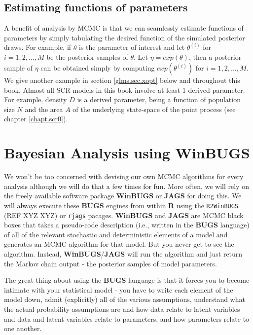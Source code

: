 \subsection{Estimating functions of parameters}

A benefit of analysis by MCMC is that we can seamlessly estimate
functions of parameters by simply tabulating the desired function of
the simulated posterior draws. For example, if $\theta$ is the
parameter of interest and let $\theta^{(i)}$ for $i=1,2,\ldots,M$ be
the posterior samples of $\theta$. Let $\eta = exp(\theta)$, then a
posterior sample of $\eta$ can be obtained simply by computing
$exp(\theta^{(i)})$ for $i=1,2,\ldots,M$. We give another example in
section
\ref{glms.sec.xopt}
below and throughout this book.
Almost all SCR models in this book involve at least 1 derived
parameter. For example, density $D$ is a derived parameter, being a
function of population size $N$ and the area $A$ of the underlying
state-space of the point process (see chapter \ref{chapt.scr0}).

\section{Bayesian Analysis using WinBUGS}

We won't be too concerned with devising our own MCMC algorithms for
every analysis
although we will do that a few times for fun.  More often, we
will rely on the freely available software package {\bf WinBUGS} or
{\bf JAGS}
for doing this.  We will always execute these {\bf BUGS} engines from
within {\bf R} using the \mbox{\tt R2WinBUGS} (REF XYZ XYZ) or
\mbox{\tt rjags} pacages. {\bf WinBUGS} and {\bf JAGS} are  MCMC black boxes
that takes a pseudo-code description (i.e., written in the {\bf BUGS}
language) of all of the relevant stochastic
and deterministic elements of a model and generates an MCMC algorithm
for that model. But you never get to see the algorithm. Instead,
{\bf WinBUGS}/{\bf JAGS} will run the algorithm and just return the Markov chain output
- the posterior samples of model parameters.

The great thing about using the {\bf BUGS} language is that it forces
you to become intimate with your statistical model - you have to write
each element of the model down, admit (explicitly) all of the various
assumptions, understand what the actual probability assumptions are
and how data relate to latent variables and data and latent variables
relate to parameters, and how parameters relate to one another.

